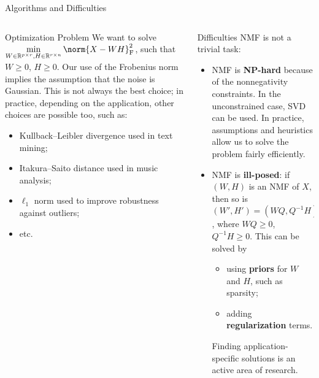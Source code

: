 \documentclass[final]{beamer}
\newlength{\onecolwid}
\newlength{\threecolwid}
\begin{document}
\begin{frame}
\begin{columns}[t]
\begin{column}{\threecolwid}
\begin{exampleblock}{Algorithms and Difficulties}
\begin{columns}[t]
\begin{column}{\onecolwid}
\begin{block}{Optimization Problem}
We want to solve \(\displaystyle \min_{W \in \mathbb{R}^{p \times r}, H \in \mathbb{R}^{r \times n}} \norm{X - WH}^2_{\textnormal{F}}\), such that \(W \geqslant 0\), \(H \geqslant 0\).
Our use of the Frobenius norm implies the assumption that the noise is Gaussian.
This is not always the best choice; in practice, depending on the application, other choices are possible too, such as:
\begin{itemize}
    \item Kullback--Leibler divergence used in text mining;
    \item Itakura--Saito distance used in music analysis;
    \item \(\ell_1\) norm used to improve robustness against outliers;
    \item etc.
\end{itemize}
\end{block}
\end{column}
\begin{column}{\onecolwid}
\begin{block}{Difficulties}
NMF is not a trivial task:
\begin{itemize}
    \item NMF is \textbf{NP-hard} because of the nonnegativity constraints.
    In the unconstrained case, SVD can be used.
    In practice, assumptions and heuristics allow us to solve the problem fairly efficiently.
    \item NMF is \textbf{ill-posed}: if \((W, H)\) is an NMF of \(X\), then so is \((W', H') = (WQ, Q^{-1}H)\), where \(WQ \geqslant 0\), \(Q^{-1}H \geqslant 0\).
    This can be solved by
    \begin{itemize}
        \item using \textbf{priors} for \(W\) and \(H\), such as sparsity;
        \item adding \textbf{regularization} terms.
    \end{itemize}
    Finding application-specific solutions is an active area of research.
\end{itemize}
\end{block}
\end{column}
\end{columns}
\end{exampleblock}


\end{column}
\end{columns}
\end{frame}
\end{document}
